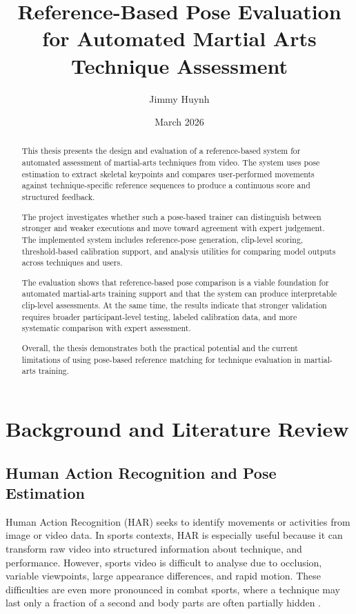 \documentclass[12pt]{article}
\title{Reference-Based Pose Evaluation for Automated Martial Arts Technique Assessment}
\author{Jimmy Huynh}
\date{March 2026}
\begin{document}
\maketitle
\thispagestyle{empty}
\clearpage
{}

\begin{abstract}
This thesis presents the design and evaluation of a reference-based system for automated assessment of martial-arts techniques from video. The system uses pose estimation to extract skeletal keypoints and compares user-performed movements against technique-specific reference sequences to produce a continuous score and structured feedback.

The project investigates whether such a pose-based trainer can distinguish between stronger and weaker executions and move toward agreement with expert judgement. The implemented system includes reference-pose generation, clip-level scoring, threshold-based calibration support, and analysis utilities for comparing model outputs across techniques and users.

The evaluation shows that reference-based pose comparison is a viable foundation for automated martial-arts training support and that the system can produce interpretable clip-level assessments. At the same time, the results indicate that stronger validation requires broader participant-level testing, labeled calibration data, and more systematic comparison with expert assessment.

Overall, the thesis demonstrates both the practical potential and the current limitations of using pose-based reference matching for technique evaluation in martial-arts training.
\end{abstract}

\newpage
\section{Background and Literature Review}
\subsection{Human Action Recognition and Pose Estimation}
Human Action Recognition (HAR) seeks to identify movements or activities from image or video data. In sports contexts, HAR is especially useful because it can transform raw video into structured information about technique, and performance. However, sports video is difficult to analyse due to occlusion, variable viewpoints, large appearance differences, and rapid motion. These difficulties are even more pronounced in combat sports, where a technique may last only a fraction of a second and body parts are often partially hidden \cite{wu2024sthka}.
\end{document}
